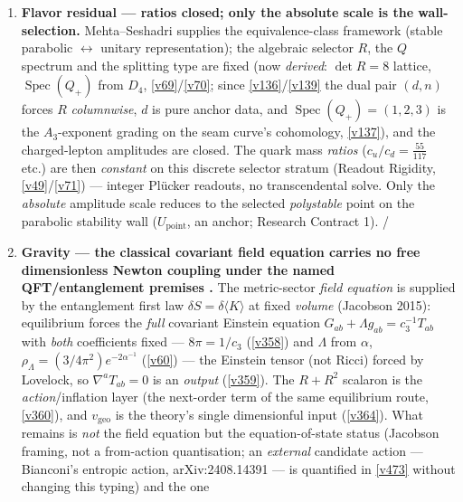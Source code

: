 \documentclass[11pt,a4paper]{article}
\newcommand{\cthree}{c_3}
\begin{document}
\begin{gapboxnb}
\begin{enumerate}[leftmargin=1.6em,itemsep=2pt,topsep=2pt]
\item \textbf{Flavor residual --- ratios closed; only the absolute scale is the wall-selection.}
      Mehta--Seshadri supplies the equivalence-class framework (stable parabolic $\leftrightarrow$ unitary
      representation); the algebraic selector $R$, the $Q$ spectrum and the splitting type are fixed (now
      \emph{derived}: $\det R=8$ lattice, $\operatorname{Spec}(Q_+)$ from $D_4$, \vref{v69}/\vref{v70}; since
      \vref{v136}/\vref{v139} the dual pair $(d,n)$ forces $R$ \emph{columnwise}, $d$ is pure anchor data, and
      $\operatorname{Spec}(Q_+)=(1,2,3)$ is the $A_3$-exponent grading on the seam curve's cohomology,
      \vref{v137}), and the charged-lepton amplitudes are closed. The quark mass \emph{ratios}
      ($c_u/c_d=\tfrac{55}{117}$ etc.) are
      then \emph{constant} on this discrete selector stratum (Readout Rigidity, \vref{v49}/\vref{v71}) --- integer Pl\"ucker
      readouts, no transcendental solve. Only the \emph{absolute} amplitude scale reduces to the selected
      \emph{polystable} point on the parabolic stability wall ($U_{\mathrm{point}}$, an anchor; Research
      Contract 1). \mE/\mO
\item \textbf{Gravity --- the classical covariant field equation carries no free dimensionless Newton coupling under the named QFT/entanglement premises \mC.} The metric-sector \emph{field
      equation} is supplied by the entanglement first law $\delta S=\delta\langle K\rangle$ at fixed
      \emph{volume} (Jacobson 2015): equilibrium forces the \emph{full} covariant Einstein equation
      $G_{ab}{+}\Lambda g_{ab}=\cthree^{-1}T_{ab}$ with \emph{both} coefficients fixed --- $8\pi{=}1/\cthree$
      (\vref{v358}) and $\Lambda$ from $\alpha$, $\rho_\Lambda{=}(3/4\pi^2)e^{-2\alpha^{-1}}$ (\vref{v60}) ---
      the Einstein tensor (not Ricci) forced by Lovelock, so $\nabla^aT_{ab}{=}0$ is an \emph{output}
      (\vref{v359}). The $R{+}R^2$ scalaron is the \emph{action}/inflation layer (the next-order term of the
      same equilibrium route, \vref{v360}), and $v_{\mathrm{geo}}$ is the theory's single dimensionful input
      (\vref{v364}). What remains is \emph{not} the field equation but the equation-of-state status (Jacobson
      framing, not a from-action quantisation; an \emph{external} candidate action --- Bianconi's entropic
      action, arXiv:2408.14391 --- is quantified in \vref{v473} without changing this typing) and the one

\end{enumerate}
\end{gapboxnb}
\end{document}
